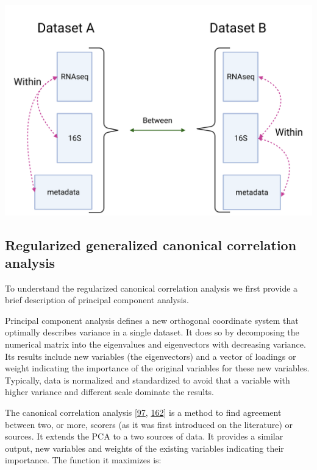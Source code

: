 \documentclass[
  12pt,
  a4paper,
  twoside,
  openright]{book}
\let\origfigure\figure
\let\endorigfigure\endfigure
\renewenvironment{figure}[1][2] {
    \expandafter\origfigure\expandafter[!htp]
} {
    \endorigfigure
}
\begin{document}
\begin{figure}
\includegraphics[width=1\linewidth]{images/multiomic_datasets} \caption[Multi-omic relationships.]{Multi-omic relationships on different datasets. Integration methods focus on relationships within datasets. Common relationships between datasets are used as confirmation/validation. Created with BioRender.com}\label{fig:multiomic-datasets}
\end{figure}

\hypertarget{regularized-generalized-canonical-correlation-analysis}{%
\subsection{Regularized generalized canonical correlation analysis}\label{regularized-generalized-canonical-correlation-analysis}}

To understand the regularized canonical correlation analysis we first provide a brief description of principal component analysis.

Principal component analysis defines a new orthogonal coordinate system that optimally describes variance in a single dataset.
It does so by decomposing the numerical matrix into the eigenvalues and eigenvectors with decreasing variance.
Its results include new variables (the eigenvectors) and a vector of loadings or weight indicating the importance of the original variables for these new variables.
Typically, data is normalized and standardized to avoid that a variable with higher variance and different scale dominate the results.

The canonical correlation analysis {[}\protect\hyperlink{ref-hotelling1936}{97}, \protect\hyperlink{ref-jordan1875}{162}{]} is a method to find agreement between two, or more, scorers (as it was first introduced on the literature) or sources.
It extends the PCA to a two sources of data.
It provides a similar output, new variables and weights of the existing variables indicating their importance.
The function it maximizes is:
\end{document}

